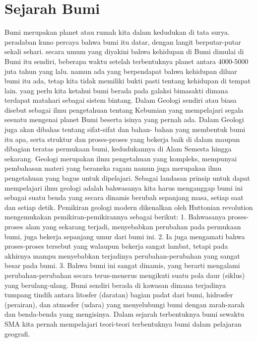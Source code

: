 
\section{Sejarah Bumi}
Bumi merupakan planet atau rumah kita dalam kedudukan di tata surya. peradaban kuno percaya bahwa bumi itu datar, dengan langit berputar-putar sekali sehari. secara umum yang diyakini bahwa kehidupan di Bumi dimulai di Bumi itu sendiri, beberapa waktu setelah terbentuknya planet antara 4000-5000 juta tahun yang lalu. namun ada yang berpendapat bahwa kehidupan diluar bumi itu ada, tetap kita tidak memiliki bukti pasti tentang kehidupan di tempat lain. yang perlu kita ketahui bumi berada pada galaksi bimasakti dimana terdapat matahari sebagai sistem bintang.
Dalam Geologi sendiri atau biasa disebut sebagai ilmu pengetahuan tentang Kebumian yang mempelajari segala sesuatu mengenai planet Bumi beserta isinya yang pernah ada. Dalam Geologi juga akan dibahas tentang sifat-sifat dan bahan- bahan yang membentuk bumi itu apa, serta struktur dan proses-proses yang bekerja baik di dalam maupun dibagian teratas permukaan bumi, kedudukannya di Alam Semesta hingga sekarang. Geologi merupakan ilmu pengetahuan yang kompleks, mempunyai pembahasan materi yang beraneka ragam namun juga merupakan ilmu pengetahuan yang bagus untuk dipelajari. Sebagai landasan prinsip untuk dapat mempelajari ilmu geologi adalah bahwasanya kita harus menganggap bumi ini sebagai suatu benda yang secara dinamis berubah sepanjang masa, setiap saat dan setiap detik. 
Pemikiran geologi modern dikenalkan oleh Huttonian revolution mengemukakan pemikiran-pemikirannya sebagai berikut:
1. Bahwasanya proses-proses alam yang sekarang terjadi, menyebabkan perubahan pada permukaan bumi, juga bekerja sepanjang umur dari bumi ini. 
2. Ia juga mengamati bahwa proses-proses tersebut yang walaupun bekerja sangat lambat, tetapi pada akhirnya mampu menyebabkan terjadinya perubahan-perubahan yang sangat besar pada bumi. 
3. Bahwa bumi ini sangat dinamis, yang berarti mengalami perubahan-perubahan secara terus-menerus mengikuti suatu pola daur (siklus) yang berulang-ulang.
Bumi sendiri berada di kawasan dimana terjadinya tumpang tindih antara litosfer (daratan) bagian padat dari bumi, hidrosfer (perairan), dan atmosfer (udara) yang menyelubungi bumi dengan zarah-zarah dan benda-benda yang mengisinya.
Dalam sejarah terbentuknya bumi sewaktu SMA kita pernah mempelajari teori-teori terbentuknya bumi dalam pelajaran geografi.\cite{wetherill1990formation}

